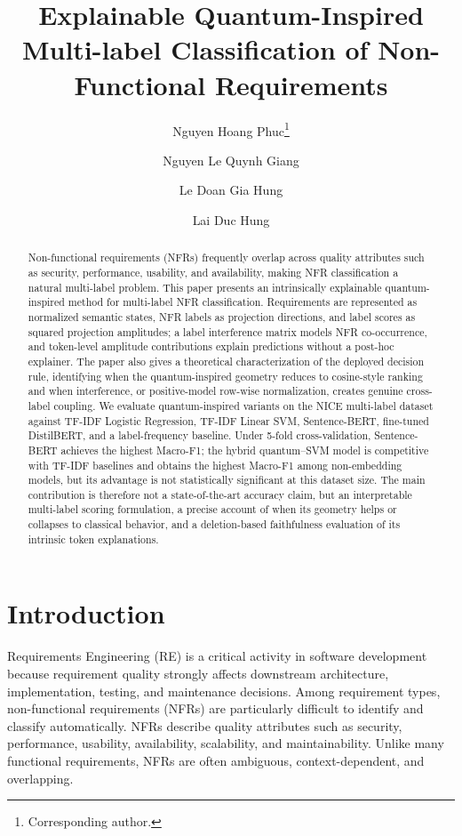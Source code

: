 \documentclass[runningheads]{llncs}
\title{Explainable Quantum-Inspired Multi-label Classification of Non-Functional Requirements}
\author{Nguyen Hoang Phuc\inst{1}\thanks{Corresponding author.} \and
Nguyen Le Quynh Giang\inst{1} \and
Le Doan Gia Hung\inst{1} \and
Lai Duc Hung\inst{1}\orcidID{0009-0000-6774-8046}}
\institute{FPT University, Ho Chi Minh City, 700000, Vietnam \\
\email{nphuc4748@gmail.com, nguyengiang14012005@gmail.com,\\
lhung291005@gmail.com, hungld@fpt.edu.vn}}
\begin{document}
\maketitle

\begin{abstract}
Non-functional requirements (NFRs) frequently overlap across quality attributes
such as security, performance, usability, and availability, making NFR
classification a natural multi-label problem. This paper presents an
intrinsically explainable quantum-inspired method for multi-label NFR
classification. Requirements are represented as normalized semantic states,
NFR labels as projection directions, and label scores as squared projection
amplitudes; a label interference matrix models NFR co-occurrence, and
token-level amplitude contributions explain predictions without a post-hoc
explainer. The paper also gives a theoretical characterization of the deployed
decision rule, identifying when the quantum-inspired geometry reduces to
cosine-style ranking and when interference, or positive-model row-wise
normalization, creates genuine cross-label coupling. We evaluate
quantum-inspired variants on the
NICE multi-label dataset against TF-IDF Logistic Regression, TF-IDF Linear SVM,
Sentence-BERT, fine-tuned DistilBERT, and a label-frequency baseline. Under
5-fold cross-validation, Sentence-BERT achieves the highest Macro-F1; the
hybrid quantum--SVM model is competitive with TF-IDF baselines and obtains the
highest Macro-F1 among non-embedding models, but its advantage is not
statistically significant at this dataset size. The main contribution is
therefore not a state-of-the-art accuracy claim, but an interpretable
multi-label scoring formulation, a precise account of when its geometry helps
or collapses to classical behavior, and a deletion-based faithfulness
evaluation of its intrinsic token explanations.
\end{abstract}

\section{Introduction}
Requirements Engineering (RE) is a critical activity in software development
because requirement quality strongly affects downstream architecture,
implementation, testing, and maintenance decisions. Among requirement types,
non-functional requirements (NFRs) are particularly difficult to identify and
classify automatically. NFRs describe quality attributes such as security,
performance, usability, availability, scalability, and maintainability. Unlike
many functional requirements, NFRs are often ambiguous, context-dependent, and
overlapping.
\end{document}
